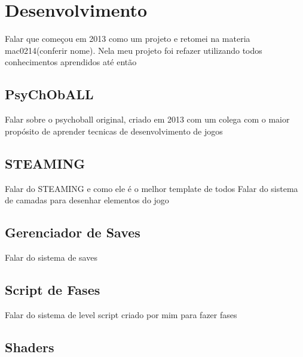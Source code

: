 \chapter{Desenvolvimento}
\label{cap:desenvolvimento}

Falar que começou em 2013 como um projeto e retomei na materia mac0214(conferir nome). Nela meu projeto foi refazer utilizando todos conhecimentos aprendidos até então

\section{PsyChObALL}
\label{sec:psychoball}

Falar sobre o psychoball original, criado em 2013 com um colega com o maior propósito de aprender tecnicas de desenvolvimento de jogos

\section{STEAMING}
\label{sec:steaming}

Falar do STEAMING e como ele é o melhor template de todos
Falar do sistema de camadas para desenhar elementos do jogo

\section{Gerenciador de Saves}
\label{sec:gerenciador_de_saves}

Falar do sistema de saves

\section{Script de Fases}
\label{sec:level_script}

Falar do sistema de level script criado por mim para fazer fases

\section{Shaders}
\label{sec:shaders}

